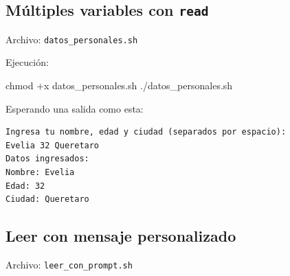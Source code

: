 \documentclass[
  spanish,
  12pt,
  letterpaper,
  DIV=11,
  numbers=noendperiod]{scrreprt}
\newenvironment{Shaded}{\begin{snugshade}}{\end{snugshade}}
\newcommand{\AttributeTok}[1]{\textcolor[rgb]{0.40,0.45,0.13}{#1}}
\newcommand{\BuiltInTok}[1]{\textcolor[rgb]{0.00,0.23,0.31}{#1}}
\newcommand{\CommentTok}[1]{\textcolor[rgb]{0.37,0.37,0.37}{#1}}
\newcommand{\ExtensionTok}[1]{\textcolor[rgb]{0.00,0.23,0.31}{#1}}
\newcommand{\FunctionTok}[1]{\textcolor[rgb]{0.28,0.35,0.67}{#1}}
\newcommand{\NormalTok}[1]{\textcolor[rgb]{0.00,0.23,0.31}{#1}}
\newcommand{\StringTok}[1]{\textcolor[rgb]{0.13,0.47,0.30}{#1}}
\newcommand{\VariableTok}[1]{\textcolor[rgb]{0.07,0.07,0.07}{#1}}
\begin{document}
\subsection{\texorpdfstring{Múltiples variables con
\texttt{read}}{Múltiples variables con read}}\label{muxfaltiples-variables-con-read}

Archivo: \texttt{datos\_personales.sh}

\begin{Shaded}
\end{Shaded}

Ejecución:

\begin{Shaded}
\begin{Highlighting}[]
\FunctionTok{chmod}\NormalTok{ +x datos\_personales.sh}
\ExtensionTok{./datos\_personales.sh}
\end{Highlighting}
\end{Shaded}

Esperando una salida como esta:

\begin{verbatim}
Ingresa tu nombre, edad y ciudad (separados por espacio):
Evelia 32 Queretaro
Datos ingresados:
Nombre: Evelia
Edad: 32
Ciudad: Queretaro
\end{verbatim}

\subsection{Leer con mensaje
personalizado}\label{leer-con-mensaje-personalizado}

Archivo: \texttt{leer\_con\_prompt.sh}

\begin{Shaded}
\end{Shaded}
\end{document}
